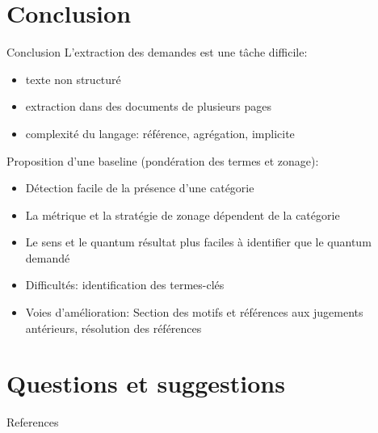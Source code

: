 \documentclass[newPxFont,pagenumber]{beamer}
\begin{document}
\section{Conclusion}
\begin{frame}{Conclusion}
L'extraction des demandes est une tâche difficile:
\begin{itemize}
\item texte non structuré
\item extraction dans des documents de plusieurs pages
\item complexité du langage: référence, agrégation, implicite
\end{itemize}
Proposition d'une baseline (pondération des termes et zonage):
\begin{itemize}
\item Détection facile de la présence d'une catégorie
\item La métrique et la stratégie de zonage dépendent de la catégorie
\item Le sens et le quantum résultat plus faciles à identifier que le quantum demandé
\item Difficultés: identification des termes-clés
\item Voies d'amélioration: Section des motifs et références aux jugements antérieurs, résolution des références 
\end{itemize}
\end{frame}

\section{Questions et suggestions}

\begin{frame}[t,allowframebreaks]{References}
\tiny

	
\end{frame}
\end{document}

